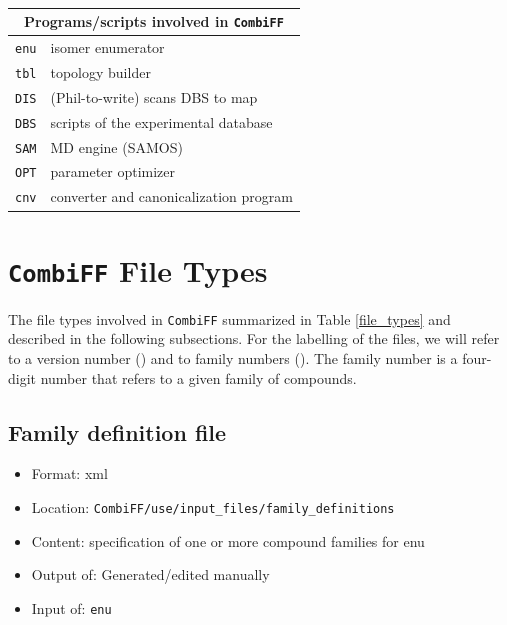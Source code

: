 \documentclass[a4paper,11pt]{article}
\begin{document}
\begin{table}[h!]
\begin{center}
\begin{tabular}{|l|l|}
\hline\hline
\multicolumn{2}{|c|}{Programs/scripts involved in \texttt{CombiFF}}\\
\hline
\texttt{enu} &  isomer enumerator \\
\texttt{tbl} &  topology builder \\
\texttt{DIS} &  (Phil-to-write) scans DBS to map \\
\texttt{DBS} &  scripts of the experimental database \\
\texttt{SAM} &  MD engine (SAMOS) \\
\texttt{OPT} &  parameter optimizer \\
\texttt{cnv} & converter and canonicalization program \\
\hline\hline
\end{tabular}
\end{center}
\caption{}
\label{programs}
\end{table}


\section{\texttt{CombiFF} File Types}

The file types involved in \texttt{CombiFF} 
summarized in Table \ref{file_types} and described 
in the following subsections.
%
For the labelling of the files, we will refer
to a version number (\vers) and to family numbers (\fami).
%
The family number is a four-digit number that refers to a given
family of compounds.
%

\subsection{Family definition file}
\label{filetype_fdf}

\begin{itemize}
\item Format: xml
\item Location: \texttt{CombiFF/use/input\_files/family\_definitions}
\item Content: specification of one or more compound families for enu 
\item Output of: Generated/edited manually
\item Input of: {\texttt{enu}}
\end{itemize}
\end{document}

